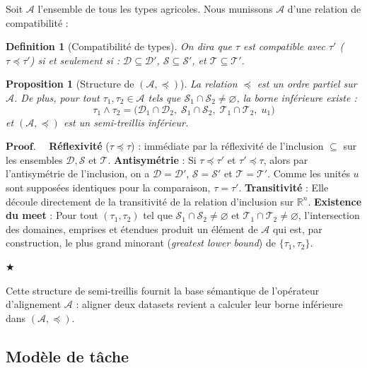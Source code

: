 \documentclass[12pt]{article}
\newtheorem{proposition}{Proposition}[section]
\newtheorem{definition}{Definition}[section]
\newenvironment{proof}{$\mathbf{Proof.\quad}$}{\begin{flushright}$\bigstar$\end{flushright}}
\newcommand{\R}{\mathbb{R}}
\begin{document}
Soit $\mathcal{A}$ l'ensemble de tous les types agricoles.
Nous munissons $\mathcal{A}$ d'une relation de compatibilité :

\begin{definition}[Compatibilité de types]
	\label{def:compat} On dira que $\tau$ est compatible avec $\tau'$ (	$\tau \preceq \tau'$) si et seulement si :
	$\mathcal{D} \subseteq \mathcal{D}'$,
	$\mathcal{S} \subseteq\mathcal{S}'$, et
	$\mathcal{T} \subseteq \mathcal{T}'$.
\end{definition}
	\begin{proposition}[Structure de $(\mathcal{A}, \preceq)$]
	\label{prop:lattice}
	La relation $\preceq$ est un ordre partiel sur $\mathcal{A}$.
	De plus, pour tout $\tau_1, \tau_2 \in \mathcal{A}$ tels que
	$\mathcal{S}_1 \cap \mathcal{S}_2 \neq \varnothing$, la borne inférieure
	existe :
	$$
	\tau_1 \wedge \tau_2 = \bigl(\mathcal{D}_1 \cap \mathcal{D}_2,\;
	\mathcal{S}_1 \cap \mathcal{S}_2,\;
	\mathcal{T}_1 \cap \mathcal{T}_2,\;
	u_1\bigr)
	$$
	et $(\mathcal{A}, \preceq)$ est un semi-treillis inférieur.
\end{proposition}
\begin{proof}
	\textbf{Réflexivité} ($\tau \preceq \tau$) : immédiate par la réflexivité de l'inclusion $\subseteq$ sur les ensembles $\mathcal{D}, \mathcal{S}$ et $\mathcal{T}$.
	\textbf{Antisymétrie} : Si $\tau \preceq \tau'$ et $\tau' \preceq \tau$, alors par l'antisymétrie de l'inclusion, on a $\mathcal{D} = \mathcal{D}'$, $\mathcal{S} = \mathcal{S}'$ et $\mathcal{T} = \mathcal{T}'$. Comme les unités $u$ sont supposées identiques pour la comparaison, $\tau = \tau'$.
	\textbf{Transitivité} : Elle découle directement de la transitivité de la relation d'inclusion sur $\R^n$.
	\textbf{Existence du meet} : Pour tout $(\tau_1, \tau_2)$ tel que $\mathcal{S}_1 \cap \mathcal{S}_2 \neq \varnothing$ et $\mathcal{T}_1 \cap \mathcal{T}_2 \neq \varnothing$, l'intersection des domaines, emprises et étendues produit un élément de $\mathcal{A}$ qui est, par construction, le plus grand minorant (\textit{greatest lower bound}) de $\{\tau_1, \tau_2\}$.
\end{proof}
Cette structure de semi-treillis fournit la base sémantique de l’opérateur
d'alignement $\mathcal{A}$ : aligner deux datasets revient a calculer
leur borne inférieure dans $(\mathcal{A},\preceq)$.


\subsection{Modèle de tâche}
\label{subsec:task}
\end{document}
